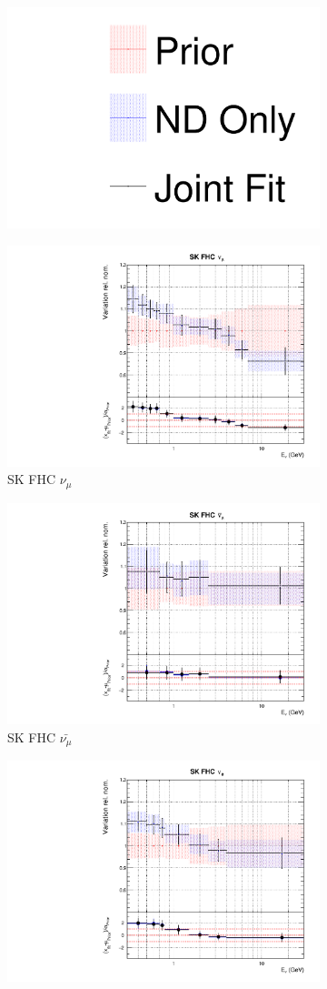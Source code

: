 \begin{figure}[!htbp]
\centering
\begin{subfigure}{0.8\textwidth}
  \centering
  \includegraphics[width=0.24\linewidth]{figs/joint_leg}
\end{subfigure}
\begin{subfigure}{0.45\textwidth}
  \centering
  \includegraphics[width=0.75\linewidth]{figs/jointflux8}
  \caption{SK FHC $\nu_{\mu}$}
\end{subfigure}
\begin{subfigure}{0.45\textwidth}
  \centering
  \includegraphics[width=0.75\linewidth]{figs/jointflux9}
  \caption{SK FHC $\bar{\nu_{\mu}}$}
\end{subfigure}
\begin{subfigure}{0.45\textwidth}
  \centering
  \includegraphics[width=0.75\linewidth]{figs/jointflux10}

\end{subfigure}
\end{figure}
